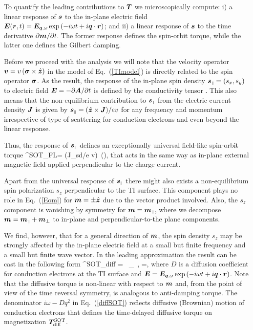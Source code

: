 To quantify the leading contributions to $\boldsymbol{T}$ we microscopically compute: i) a linear response of $\boldsymbol{s}$ to the in-plane electric field $\boldsymbol{E}(\boldsymbol{r},t)= \boldsymbol{E}_{\boldsymbol{q},\omega}\exp\left(-i\omega t+i\boldsymbol{q}\cdot\boldsymbol{r}\right)$; and ii) a linear response of $\boldsymbol{s}$ to the time derivative $\partial \boldsymbol{m}/\partial t$. The former response defines the spin-orbit torque, while the latter one defines the Gilbert damping. 
 
Before we proceed with the analysis we will note that the velocity operator $\boldsymbol{v} = v\,(\boldsymbol{\sigma}\times \hat{\boldsymbol{z}})$ in the model of Eq.~(\ref{TImodel})  is directly related to the spin operator $\boldsymbol{\sigma}$. As the result, the response of the in-plane spin density $\boldsymbol{s}_{\scriptscriptstyle\parallel}=(s_{x}, s_{y})$ to electric field $\boldsymbol{E}=-\partial\boldsymbol{A}/\partial t$ is defined by the conductivity tensor \cite{ndiaye_dirac_2017,Ghosh18}. This also means that the non-equilibrium contribution to $\boldsymbol{s}_{\scriptscriptstyle\parallel}$ from the electric current density $\boldsymbol{J}$ is given by $\boldsymbol{s}_{\scriptscriptstyle\parallel}= (\hat{\boldsymbol{z}}\times\boldsymbol{J} )/ev$ for any frequency and momentum irrespective of type of scattering for conduction electrons and even beyond the linear response. 

Thus, the response of $\boldsymbol{s}_{\scriptscriptstyle\parallel}$ defines an exceptionally universal field-like spin-orbit torque
\be
\label{TFL}
^\textrm{SOT}_\textrm{FL}= (J_\textrm{sd}/\hslash e v)\, \times(\times{}),
\e 
that acts in the same way as in-plane external magnetic field applied perpendicular to the charge current. 

Apart from the universal response of $\boldsymbol{s}_{\scriptscriptstyle\parallel}$ there might also exists a non-equilibrium spin polarization $s_z$ perpendicular to the TI surface. This component plays no role in Eq.~(\ref{Eom}) for $\boldsymbol{m}= \pm \hat{\boldsymbol{z}}$ due to the vector product involved. Also, the $s_z$ component is vanishing by symmetry for $\boldsymbol{m}=\boldsymbol{m}_{\scriptscriptstyle\parallel}$, where we decompose $\boldsymbol{m} =\boldsymbol{m}_{\scriptscriptstyle\parallel}+\boldsymbol{m}_\perp$ to in-plane and perpendicular-to-the plane components.

We find, however, that for a general direction of $\boldsymbol{m}$, the spin density $s_z$ may be strongly affected by the in-plane electric field at a small but finite frequency and a small but finite wave vector. In the leading approximation the result can be cast in the following form 
\be
\label{diffSOT}
^\textrm{SOT}_\textrm{diff} = \eta\, \times{}_\perp\, ,\quad
\eta=,
\e
where $D$ is a diffusion coefficient for conduction electrons at the TI surface and $\boldsymbol{E}= \boldsymbol{E}_{\boldsymbol{q},\omega}\exp\left(-i\omega t+i\boldsymbol{q}\cdot\boldsymbol{r}\right)$. Note that the diffusive torque is non-linear with respect to $\boldsymbol{m}$ and, from the point of view of the time reversal symmetry, is analogous to anti-damping torque. The denominator $i\omega -Dq^2$ in Eq.~(\ref{diffSOT}) reflects diffusive (Brownian) motion of conduction electrons that defines the time-delayed diffusive torque on magnetization $\boldsymbol{T}^\textrm{SOT}_\textrm{diff}$.  

